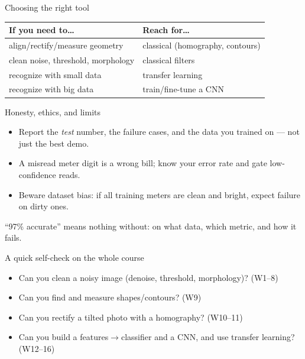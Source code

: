\documentclass[10pt,aspectratio=169]{beamer}
\begin{document}
\begin{frame}{Choosing the right tool}
  \begin{center}
  \begin{tabular}{@{}ll@{}}
    \toprule
    \textbf{If you need to\ldots} & \textbf{Reach for\ldots} \\
    \midrule
    align/rectify/measure geometry & classical (homography, contours) \\
    clean noise, threshold, morphology & classical filters \\
    recognize with small data & transfer learning \\
    recognize with big data & train/fine-tune a CNN \\
    \bottomrule
  \end{tabular}
  \end{center}
\end{frame}

\begin{frame}{Honesty, ethics, and limits}
  \begin{itemize}
    \item Report the \emph{test} number, the failure cases, and the data you trained on — not just the best demo.
    \item A misread meter digit is a wrong bill; know your error rate and gate low-confidence reads.
    \item Beware dataset bias: if all training meters are clean and bright, expect failure on dirty ones.
  \end{itemize}
  \begin{badbox}
    ``97\% accurate'' means nothing without: on what data, which metric, and how it fails.
  \end{badbox}
\end{frame}

\begin{frame}{A quick self-check on the whole course}
  \begin{itemize}
    \item Can you clean a noisy image (denoise, threshold, morphology)? (W1--8)
    \item Can you find and measure shapes/contours? (W9)
    \item Can you rectify a tilted photo with a homography? (W10--11)
    \item Can you build a features$\rightarrow$classifier and a CNN, and use transfer learning? (W12--16)
  \end{itemize}
\end{frame}
\end{document}
